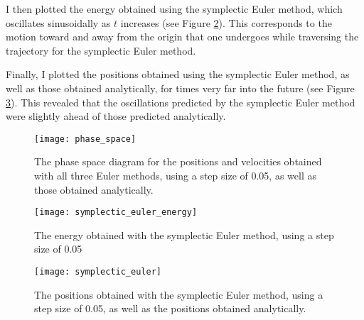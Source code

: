 \documentclass[11pt]{article}
\begin{document}
I then plotted the energy obtained using the symplectic Euler method, which oscillates sinusoidally as $t$ increases (see Figure \ref{fig:energy2}). This corresponds to the motion toward and away from the origin that one undergoes while traversing the trajectory for the symplectic Euler method.

Finally, I plotted the positions obtained using the symplectic Euler method, as well as those obtained analytically, for times very far into the future (see Figure \ref{fig:positionsAndVelocities2}). This revealed that the oscillations predicted by the symplectic Euler method were slightly ahead of those predicted analytically.

\begin{figure}[H]
    \texttt{[image: phase\_space]}\\
    \caption{The phase space diagram for the positions and velocities obtained with all three Euler methods, using a step size of 0.05, as well as those obtained analytically.}
    \label{fig:phaseSpace}
\end{figure}

\vfill

\begin{figure}[H]
    \texttt{[image: symplectic\_euler\_energy]}\\
    \caption{The energy obtained with the symplectic Euler method, using a step size of 0.05}
    \label{fig:energy2}
\end{figure}

\begin{figure}[H]
    \texttt{[image: symplectic\_euler]}\\
    \caption{The positions obtained with the symplectic Euler method, using a step size of 0.05, as well as the positions obtained analytically.}
    \label{fig:positionsAndVelocities2}
\end{figure}
\end{document}
